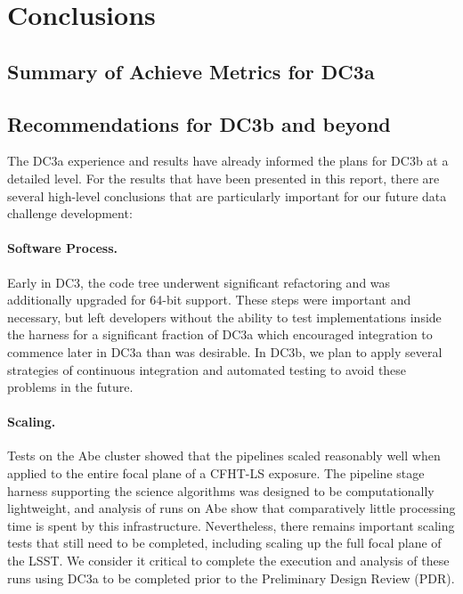 
\section{Conclusions}

\subsection{Summary of Achieve Metrics for DC3a} %

\subsection{Recommendations for DC3b and beyond}

The DC3a experience and results have already informed the plans for
DC3b at a detailed level.  For the results that have been presented in
this report, there are several high-level conclusions that are
particularly important for our future data challenge development:

\paragraph{Software Process.}  Early in DC3, the code tree underwent
significant refactoring and was additionally upgraded for 64-bit
support. These steps were important and necessary, but left developers
without the ability to test implementations inside the harness for a
significant fraction of DC3a which encouraged integration to commence
later in DC3a than was desirable.  In DC3b, we plan to apply several
strategies of continuous integration and automated testing to avoid
these problems in the future.  

\paragraph{Scaling.}  Tests on the Abe cluster showed that the
pipelines scaled reasonably well when applied to the entire focal
plane of a CFHT-LS exposure. The pipeline stage harness supporting the
science algorithms was designed to be computationally lightweight, and
analysis of runs on Abe show that comparatively little processing time
is spent by this infrastructure.  Nevertheless, there remains
important scaling tests that still need to be completed, including
scaling up the full focal plane of the LSST.  We consider it critical
to complete the execution and analysis of these runs using DC3a to be
completed prior to the Preliminary Design Review (PDR).  

